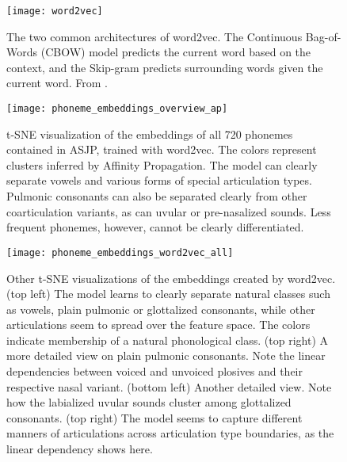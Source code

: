 \documentclass[8pt]{article}
\begin{document}
{\begin{figure}[h] %
\begin{center}
   \texttt{[image: word2vec]} 
   \caption{The two common architectures of word2vec. The Continuous Bag-of-Words (CBOW) model predicts the current word based on the
context, and the Skip-gram predicts surrounding words given the current word. From \cite{mikolov2013efficient}.}
   \label{fig:word2vec}
   \end{center}

\end{figure}


\begin{figure}[h]
\begin{center}
\texttt{[image: phoneme\_embeddings\_overview\_ap]} 
\caption{t-SNE visualization of the embeddings of all 720 phonemes contained in ASJP, trained with word2vec. The colors represent clusters inferred by Affinity Propagation. The model can clearly separate vowels and various forms of special articulation types. Pulmonic consonants can also be separated clearly from other coarticulation variants, as can uvular or pre-nasalized sounds. Less frequent phonemes, however, cannot be clearly differentiated. }
\label{fig:phoneme_embeddings_overview_ap}
\end{center}
\end{figure}

\begin{figure}[h] %
   \centering
   \texttt{[image: phoneme\_embeddings\_word2vec\_all]} 
   \caption{Other t-SNE visualizations of the embeddings created by word2vec. (top left) The model learns to clearly separate natural classes such as vowels, plain pulmonic or glottalized consonants, while other articulations seem to spread over the feature space. The colors indicate membership of a natural phonological class.  (top right) A more detailed view on plain pulmonic consonants. Note the linear dependencies between voiced and unvoiced plosives and their respective nasal variant. (bottom left) Another detailed view. Note how the labialized uvular sounds cluster among glottalized consonants. (top right) The model seems to capture different manners of articulations across articulation type boundaries, as the linear dependency shows here.}
   \label{fig:phoneme_embeddings_word2vec_all}
\end{figure}

}
\end{document}
